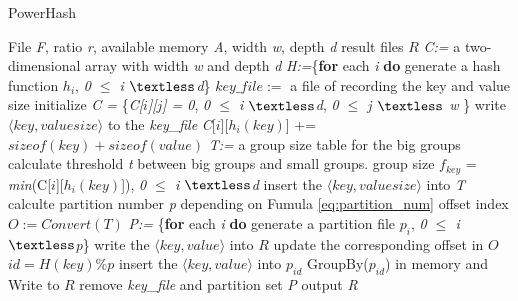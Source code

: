 \begin{algorithm}[ht]
    \caption{PowerHash}
  \label{alg:group}
    \begin{algorithmic}[1]
    \Require  File \emph{F}, ratio \emph{r}, available memory \emph{A}, width \emph{w}, depth \emph{d}
    \Ensure result files $R$
    \State \emph{C:=} a two-dimensional array with width \emph{w} and depth \emph{d}
    \State \emph{H:=}\{\textbf{for} each \emph{i} \textbf{do} generate a hash function $h_i$, \emph{0 $\le$ i $\textless$d}\}    
    \State $key\_file :=$ a file of recording the key and value size
    \State initialize \emph{C = } \{\emph{C[$i$][$j$] = 0}, \emph{0 $\le$ i $\textless$d}, \emph{0 $\le$ j $\textless$ w} \}
    	\State write $\langle key,valuesize\rangle$ to the \emph{key\_file}
          \State \emph{C}[$i$][$h_{i}(key)$] += $sizeof(key) + sizeof(value)$
        \EndFor  
    \EndFor
    \State \emph{T:=} a group size table for the big groups
    \State calculate threshold \emph{t} between big groups and small groups.
    	\State group size $f_{key}$ = \emph{min}(C[$i$][$h_{i}(key)$]), \emph{0 $\le$ i $\textless$d}
    		\State insert the $\langle key,valuesize\rangle$ into \emph{T}    
    	\EndIf    	
    \EndFor
    \State calculte partition number \emph{p} depending on Fumula \ref{eq:partition_num}
    \State offset index $O:=Convert(T)$
    \State \emph{P:=} \{\textbf{for} each \emph{i} \textbf{do} generate a partition file $p_i$, \emph{0 $\le$ i $\textless$p}\}
    		\State write the $\langle key,value\rangle$ into $R$
    		\State update the corresponding offset in $O$
    	\Else 
    		\State $id = H(key) \% p$
    		\State insert the $\langle key,value\rangle$ into $p_{id}$ 
    	\EndIf
    \EndFor
		\State GroupBy($p_{id}$) in memory and Write to $R$
    \EndFor
    \State remove \emph{key\_file} and partition set \emph{P}
    \State output \emph{R}
    \end{algorithmic}
\end{algorithm}

